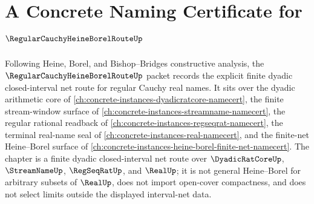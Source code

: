 \chapter{A Concrete Naming Certificate for $\RegularCauchyHeineBorelRouteUp$}
\label{ch:concrete-instances-regular-cauchy-heine-borel-route-namecert}

Following Heine, Borel, and Bishop--Bridges constructive analysis, the $\RegularCauchyHeineBorelRouteUp$ packet records the explicit finite dyadic closed-interval net route for regular Cauchy real names. It sits over the dyadic arithmetic core of \autoref{ch:concrete-instances-dyadicratcore-namecert}, the finite stream-window surface of \autoref{ch:concrete-instances-streamname-namecert}, the regular rational readback of \autoref{ch:concrete-instances-regseqrat-namecert}, the terminal real-name seal of \autoref{ch:concrete-instances-real-namecert}, and the finite-net Heine--Borel surface of \autoref{ch:concrete-instances-heine-borel-finite-net-namecert}. The chapter is a finite dyadic closed-interval net route over $\DyadicRatCoreUp$, $\StreamNameUp$, $\RegSeqRatUp$, and $\RealUp$; it is not general Heine--Borel for arbitrary subsets of $\RealUp$, does not import open-cover compactness, and does not select limits outside the displayed interval-net data.

